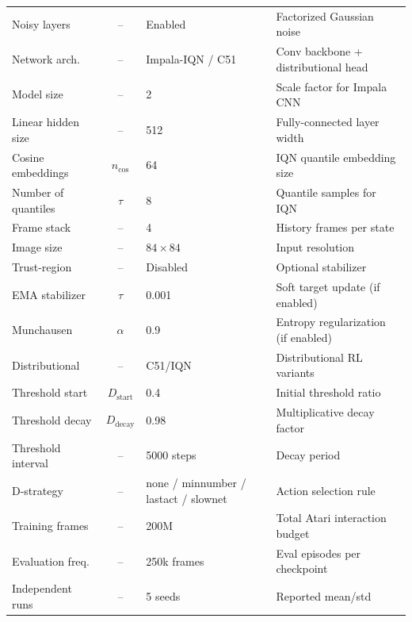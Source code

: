 \documentclass[11pt]{article}
\begin{document}
\begin{table}[htbp]
{\begin{tabular}{p{3cm} c p{3cm} p{7cm}}
Noisy layers         & --               & Enabled                   & Factorized Gaussian noise \\
Network arch.        & --               & Impala-IQN / C51          & Conv backbone + distributional head \\
Model size           & --               & 2                         & Scale factor for Impala CNN \\
Linear hidden size   & --               & 512                       & Fully-connected layer width \\
Cosine embeddings    & $n_{\cos}$       & 64                        & IQN quantile embedding size \\
Number of quantiles  & $\tau$           & 8                         & Quantile samples for IQN \\
Frame stack          & --               & 4                         & History frames per state \\
Image size           & --               & $84 \times 84$            & Input resolution \\
Trust-region         & --               & Disabled                  & Optional stabilizer \\
EMA stabilizer       & $\tau$           & 0.001                     & Soft target update (if enabled) \\
Munchausen           & $\alpha$         & 0.9                       & Entropy regularization (if enabled) \\
Distributional       & --               & C51/IQN                   & Distributional RL variants \\
Threshold start      & $D_{\text{start}}$ & 0.4                     & Initial threshold ratio \\
Threshold decay      & $D_{\text{decay}}$ & 0.98                    & Multiplicative decay factor \\
Threshold interval   & --               & 5000 steps                & Decay period \\
D-strategy           & --               & none / minnumber / lastact / slownet & Action selection rule \\
Training frames      & --               & 200M                      & Total Atari interaction budget \\
Evaluation freq.     & --               & 250k frames               & Eval episodes per checkpoint \\
Independent runs     & --               & 5 seeds                   & Reported mean/std \\
\bottomrule
\end{tabular}
}
\end{table}
\end{document}
